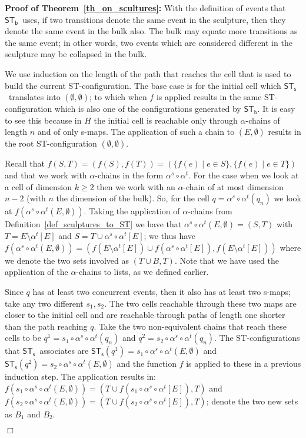 \documentclass[submission,copyright,creativecommons]{eptcs}
\newenvironment{proof}[1][\!\!\,]{\vspace{1ex}\noindent\textbf{Proof #1: }}{\hfill$\Box$\vspace{2ex}}
\newcounter{case}
\newcommand\sculpintost{\ensuremath{\mathsf{ST}_{\!\mathsf{s}}}}
\newcommand\hintostScultures{\ensuremath{\mathsf{ST}_{\!\mathsf{b}}}}
\newcommand\applyChainList[2]{\ensuremath{#1[#2]}}
\begin{document}
\begin{proof}[of Theorem~\ref{th_on_scultures}]
With the definition of events that \hintostScultures\ uses, if two transitions denote the same event in the sculpture, then they denote the same event in the bulk also. 
The bulk may equate more transitions as the same event; in other words, two events which are considered different in the sculpture may be collapsed in the bulk.

We use induction on the length of the path that reaches the cell that is used to build the current ST-configuration.
The base case is for the initial cell which \sculpintost\ translates into $(\emptyset,\emptyset)$; to which when $f$ is applied results in the same ST-configuration which is also one of the configurations generated by \hintostScultures. It is easy to see this because in $H$ the initial cell is reachable only through $\alpha$-chains of length $n$ and of only s-maps. The application of such a chain to $(E,\emptyset)$ results in the root ST-configuration $(\emptyset,\emptyset)$.

Recall that $f(S,T)=(f(S),f(T))=(\{f(e)\mid e\in S\},\{f(e)\mid e\in T\})$ and that we work with $\alpha$-chains in the form $\alpha^{s}\circ\alpha^{t}$. For the case when we look at a cell of dimension $k\geq 2$ then we work with an $\alpha$-chain of at most dimension $n-2$ (with $n$ the dimension of the bulk). So, for the cell $q=\alpha^{s}\circ\alpha^{t}(q_{n})$ we look at $f(\alpha^{s}\circ\alpha^{t}(E,\emptyset))$. Taking the application of $\alpha$-chains from Definition~\ref{def_sculptures_to_ST} we have that $\alpha^{s}\circ\alpha^{t}(E,\emptyset)=(S,T)$ with $T=E\setminus\applyChainList{\alpha^{t}}{E}$ and $S=T\cup\applyChainList{\alpha^{s}\circ\alpha^{t}}{E}$; we thus have $f(\alpha^{s}\circ\alpha^{t}(E,\emptyset))=(f(E\setminus\applyChainList{\alpha^{t}}{E})\cup f(\applyChainList{\alpha^{s}\circ\alpha^{t}}{E}),f(E\setminus\applyChainList{\alpha^{t}}{E}))$ where we denote the two sets involved as $(T\cup B,T)$. Note that we have used the application of the $\alpha$-chains to lists, as we defined earlier.

Since $q$ has at least two concurrent events, then it also has at least two s-maps; take any two different $s_{1},s_{2}$. The two cells reachable through these two maps are closer to the initial cell and are reachable through paths of length one shorter than the path reaching $q$. Take the two non-equivalent chains that reach these cells to be $q^{1}=s_{1}\circ\alpha^{s}\circ\alpha^{t}(q_{n})$ and $q^{2}=s_{2}\circ\alpha^{s}\circ\alpha^{t}(q_{n})$. The ST-configurations that \sculpintost\ associates are $\sculpintost(q^{1})=s_{1}\circ\alpha^{s}\circ\alpha^{t}(E,\emptyset)$ and $\sculpintost(q^{2})=s_{2}\circ\alpha^{s}\circ\alpha^{t}(E,\emptyset)$ and the function $f$ is applied to these in a previous induction step. The application results in: $f(s_{1}\circ\alpha^{s}\circ\alpha^{t}(E,\emptyset))=(T\cup f(\applyChainList{s_{1}\circ\alpha^{s}\circ\alpha^{t}}{E}),T)$ and $f(s_{2}\circ\alpha^{s}\circ\alpha^{t}(E,\emptyset))=(T\cup f(\applyChainList{s_{2}\circ\alpha^{s}\circ\alpha^{t}}{E}),T)$; denote the two new sets as $B_{1}$ and $B_{2}$.


\end{proof}
\end{document}
